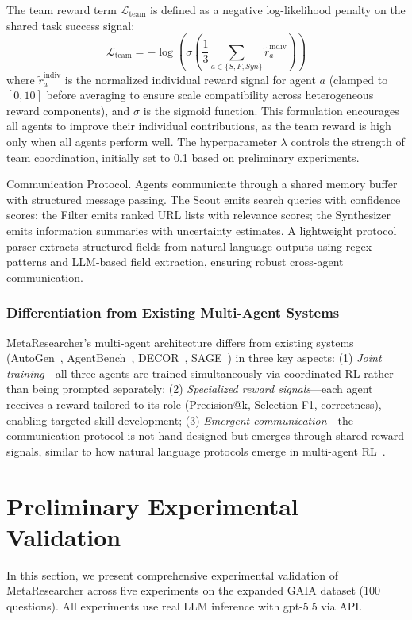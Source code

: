 \documentclass[notspecified,article,accept,pdftex,moreauthors]{Definitions/mdpi}
\renewcommand{\textbf}[1]{#1}
\begin{document}
The team reward term $\mathcal{L}_{\text{team}}$ is defined as a negative log-likelihood penalty on the shared task success signal:
\begin{equation}
\mathcal{L}_{\text{team}} = -\log\left(\sigma\left(\frac{1}{3}\sum_{a \in \{S,F,Syn\}} \tilde{r}_a^{\text{indiv}}\right)\right)
\label{eq:team-reward}
\end{equation}
where $\tilde{r}_a^{\text{indiv}}$ is the normalized individual reward signal for agent $a$ (clamped to $[0, 10]$ before averaging to ensure scale compatibility across heterogeneous reward components), and $\sigma$ is the sigmoid function. This formulation encourages all agents to improve their individual contributions, as the team reward is high only when all agents perform well. The hyperparameter $\lambda$ controls the strength of team coordination, initially set to 0.1 based on preliminary experiments.

\textbf{Communication Protocol.} Agents communicate through a shared memory buffer with structured message passing. The Scout emits search queries with confidence scores; the Filter emits ranked URL lists with relevance scores; the Synthesizer emits information summaries with uncertainty estimates. A lightweight protocol parser extracts structured fields from natural language outputs using regex patterns and LLM-based field extraction, ensuring robust cross-agent communication.

\subsubsection{Differentiation from Existing Multi-Agent Systems}
MetaResearcher's multi-agent architecture differs from existing systems (AutoGen~\cite{b56}, AgentBench~\cite{b57}, DECOR~\cite{b47}, SAGE~\cite{b48}) in three key aspects: (1) \textit{Joint training}---all three agents are trained simultaneously via coordinated RL rather than being prompted separately; (2) \textit{Specialized reward signals}---each agent receives a reward tailored to its role (Precision@k, Selection F1, correctness), enabling targeted skill development; (3) \textit{Emergent communication}---the communication protocol is not hand-designed but emerges through shared reward signals, similar to how natural language protocols emerge in multi-agent RL~\cite{b58}.
\section{Preliminary Experimental Validation}
\label{sec:experiments}
In this section, we present comprehensive experimental validation of MetaResearcher across five experiments on the expanded GAIA dataset (100 questions). All experiments use real LLM inference with gpt-5.5 via API.
\end{document}
